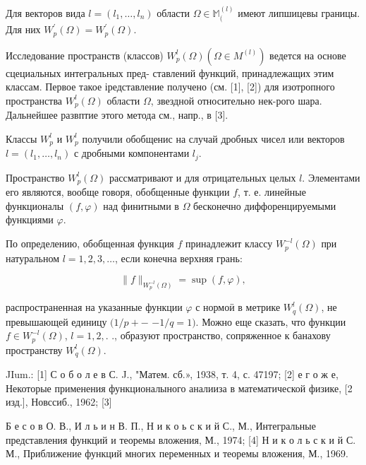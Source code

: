 \documentclass[10pt]{article}
\begin{document}
Для векторов вида $l=\left(l_{1}, \ldots, l_{n}\right)$ области $\Omega \in \mathbb{M}_{(}^{(l)}$ имеют липшицевы границы. Для них $W_{p}^{\prime}(\Omega)=W_{p}^{\prime}(\Omega)$.



Исследование пространств (классов) $W_{p}^{l}(\Omega)\left(\Omega \in M^{(l)}\right)$ ведется на основе сцециальных интегральных пред- ставлений функций, принадлежащих этим классам. Первое такое іредставление получено (см. [1], [2]) для изотропного пространства $W_{p}^{l}(\Omega)$ области $\Omega$, звездной относительно нек-рого шара. Дальнейшее развптие этого метода см., напр., в [3].



Классы $W_{p}^{l}$ и $W_{p}^{l}$ получили обобщенис на случай дробных чисел или векторов $l=\left(l_{1}, \ldots, l_{n}\right)$ с дробными компонентами $l_{j}$.



Пространство $W_{p}^{l}(\Omega)$ рассматривают и для отрицательных целых $l$. Элементами его являются, вообще говоря, обобщенные функции $f$, т. е. линейные функционалы $(f, \varphi)$ над финитными в $\Omega$ бесконечно диффоренцируемыми функциями $\varphi$.



По определению, обобщенная функция $f$ принадлежит классу $W_{p}^{-l}(\Omega)$ при натуральном $l=1,2,3, \ldots$, если конечна верхняя грань:



\[

\|f\|_{W_{p}^{-l}(\Omega)}=\sup (f, \varphi),

\]



распространенная на указанные функции $\varphi$ с нормоӥ в метрике $W_{q}^{l}(\Omega)$, не превышающей единицу $(1 / p+-$ $-1 / q=1)$. Можно еще сказать, что функции $f \in W_{p}^{-l}(\Omega)$, $l=1,2,$. ., образуют пространство, сопряженное к банахову пространству $W_{q}^{l}(\Omega)$.



JIum.: [1] С о б о л е в С. J., "Матем. сб.», 1938, т. 4, с. 47197; [2] е г о ж е, Некоторые применения функционалыного аналииза в математической физике, [2 изд.], Новссиб., 1962; [3]

Б е с о в О. В., И л ь и н В. П., Н и к о ь с к и й С., М., Интегральные представления функций и теоремы вложения, М., 1974; [4] Н и к о л ь с к и й С. М., Приближение функций многих переменных и теоремы вложения, М., 1969.
\end{document}
